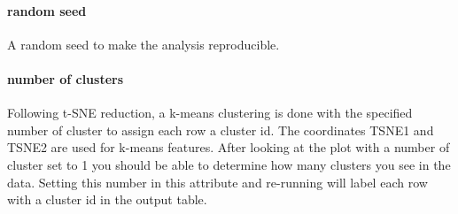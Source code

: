 \paragraph{random seed} A random seed to make the analysis reproducible.

\paragraph{number of clusters} Following t-SNE reduction, a k-means clustering is done with the specified number of cluster to assign each row a cluster id. The coordinates TSNE1 and TSNE2 are used for k-means features. After looking at the plot with a number of cluster set to 1 you should be able to determine how many clusters you see in the data. Setting this number in this attribute and re-running will label each row with a cluster id in the  output table.

